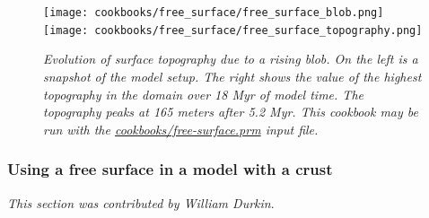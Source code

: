 \documentclass{article}
\begin{document}
\begin{figure}
  \centering
  \texttt{[image: cookbooks/free\_surface/free\_surface\_blob.png]}
  \hfill
  \texttt{[image: cookbooks/free\_surface/free\_surface\_topography.png]}
  \caption{\it Evolution of surface topography due to a rising blob.  On the left is a 
           snapshot of the model setup.  The right shows the value of the highest 
           topography in the domain over 18 Myr of model time.  The topography peaks
           at 165 meters after 5.2 Myr.  This cookbook may be run with the
           \url{cookbooks/free-surface.prm} input file.}
  \label{fig:freesurface}
\end{figure}


\subsubsection{Using a free surface in a model with a crust}
\label{sec:cookbooks-freesurfaceWC}

\textit{This section was contributed by William Durkin}.
\end{document}
